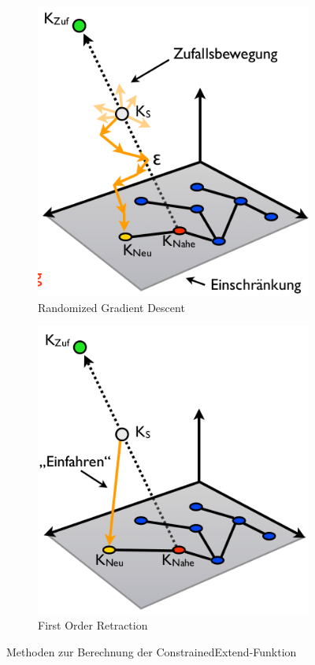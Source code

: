 \begin{figure}[h!]
	\centering
	\begin{subfigure}{.25\textwidth}
		\includegraphics[width=\textwidth]{figures/ch04_rgd.png}
		\caption{Randomized Gradient Descent}
		\label{rgd}
	\end{subfigure}
	\begin{subfigure}{.25\textwidth}
		\includegraphics[width=\textwidth]{figures/ch04_fr.png}
		\caption{First Order Retraction}
		\label{fr}
	\end{subfigure}
	\caption{Methoden zur Berechnung der ConstrainedExtend-Funktion}
	\label{fig:rrt}
\end{figure}
